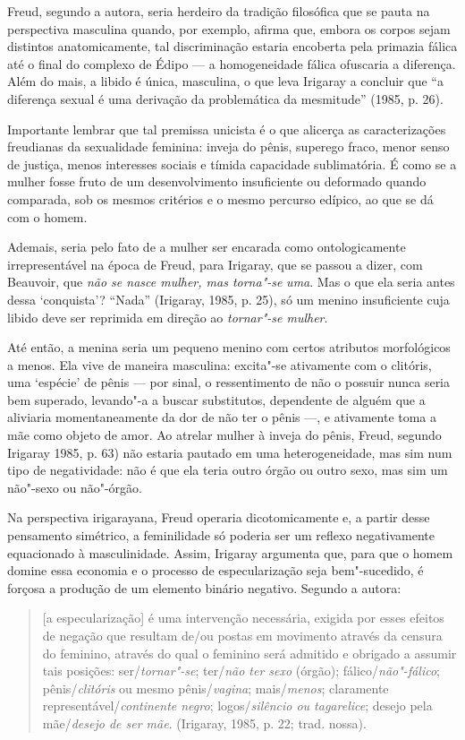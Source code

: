 Freud, segundo a autora, seria herdeiro da tradição filosófica que se
pauta na perspectiva masculina quando, por exemplo, afirma que, embora
os corpos sejam distintos anatomicamente, tal discriminação estaria
encoberta pela primazia fálica até o final do complexo de Édipo --- a
homogeneidade fálica ofuscaria a diferença. Além do mais, a libido é
única, masculina, o que leva Irigaray a concluir que ``a diferença
sexual é uma derivação da problemática da mesmitude'' (1985, p.
26).

Importante lembrar que tal premissa unicista é o que alicerça as
caracterizações freudianas da sexualidade feminina: inveja do pênis,
superego fraco, menor senso de justiça, menos interesses sociais e
tímida capacidade sublimatória. É como se a mulher fosse fruto de um
desenvolvimento insuficiente ou deformado quando comparada, sob os
mesmos critérios e o mesmo percurso edípico, ao que se dá com o homem.

Ademais, seria pelo fato de a mulher ser encarada como ontologicamente
irrepresentável na época de Freud, para Irigaray, que se passou a dizer,
com Beauvoir, que \emph{não se nasce mulher, mas torna"-se} \emph{uma}.
Mas o que ela seria antes dessa `conquista'? ``Nada'' (Irigaray,
1985, p. 25), só um menino insuficiente cuja libido deve ser
reprimida em direção ao \emph{tornar"-se mulher}.

Até então, a menina seria um pequeno menino com certos atributos
morfológicos a menos. Ela vive de maneira masculina: excita"-se
ativamente com o clitóris, uma `espécie' de pênis --- por sinal, o
ressentimento de não o possuir nunca seria bem superado, levando"-a a
buscar substitutos, dependente de alguém que a aliviaria momentaneamente
da dor de não ter o pênis ---, e ativamente toma a mãe como objeto de
amor. Ao atrelar mulher à inveja do pênis, Freud, segundo Irigaray
1985, p. 63) não estaria pautado em uma heterogeneidade, mas sim
num tipo de negatividade: não é que ela teria outro órgão ou outro sexo,
mas sim um não"-sexo ou não"-órgão.

Na perspectiva irigarayana, Freud operaria dicotomicamente e, a partir
desse pensamento simétrico, a feminilidade só poderia ser um reflexo
negativamente equacionado à masculinidade. Assim, Irigaray argumenta
que, para que o homem domine essa economia e o processo de
especularização seja bem"-sucedido, é forçosa a produção de um elemento
binário negativo. Segundo a autora:

\begin{quote}
{[}a especularização{]} é uma intervenção necessária, exigida por esses
efeitos de negação que resultam de/ou postas em movimento através da
censura do feminino, através do qual o feminino será admitido e obrigado
a assumir tais posições: ser/\emph{tornar"-se}; ter/\emph{não ter sexo}
(órgão); fálico/\emph{não"-fálico}; pênis/\emph{clitóris} ou mesmo
pênis/\emph{vagina}; mais/\emph{menos}; claramente
representável/\emph{continente negro}; logos/\emph{silêncio ou
tagarelice}; desejo pela mãe/\emph{desejo de ser mãe}. (Irigaray,
1985, p. 22; trad. nossa).
\end{quote}

